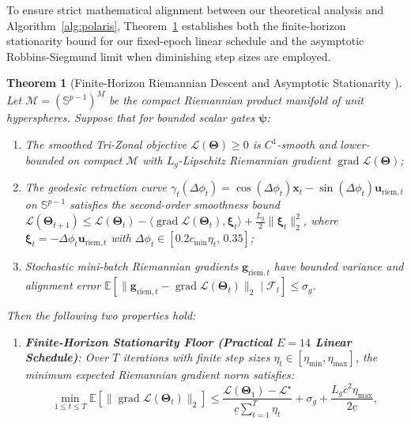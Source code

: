 \documentclass[journal]{IEEEtran}
\newtheorem{theorem}{Theorem}
\begin{document}
To ensure strict mathematical alignment between our theoretical analysis and Algorithm~\ref{alg:polaris}, Theorem~\ref{thm:convergence} establishes both the finite-horizon stationarity bound for our fixed-epoch linear schedule and the asymptotic Robbins-Siegmund limit when diminishing step sizes are employed.

\begin{theorem}[Finite-Horizon Riemannian Descent and Asymptotic Stationarity \cite{bonnabel2013stochastic,absil2008optimization}]
\label{thm:convergence}
Let $\mathcal{M} = (\mathbb{S}^{p-1})^M$ be the compact Riemannian product manifold of unit hyperspheres. Suppose that for bounded scalar gates $\boldsymbol{\psi}$:
\begin{enumerate}
    \item[(A1)] The smoothed Tri-Zonal objective $\mathcal{L}(\boldsymbol{\Theta}) \ge 0$ is $C^1$-smooth and lower-bounded on compact $\mathcal{M}$ with $L_g$-Lipschitz Riemannian gradient $\operatorname{grad}\mathcal{L}(\boldsymbol{\Theta})$;
    \item[(A2)] The geodesic retraction curve $\gamma_t(\Delta\phi_t) = \cos(\Delta\phi_t)\mathbf{x}_t - \sin(\Delta\phi_t)\mathbf{u}_{\text{riem},t}$ on $\mathbb{S}^{p-1}$ satisfies the second-order smoothness bound $\mathcal{L}(\boldsymbol{\Theta}_{t+1}) \le \mathcal{L}(\boldsymbol{\Theta}_t) - \langle \operatorname{grad}\mathcal{L}(\boldsymbol{\Theta}_t), \boldsymbol{\xi}_t \rangle + \frac{L_g}{2}\|\boldsymbol{\xi}_t\|_2^2$, where $\boldsymbol{\xi}_t = -\Delta\phi_t \mathbf{u}_{\text{riem},t}$ with $\Delta\phi_t \in [0.2 c_{\min}\eta_t, \, 0.35]$;
    \item[(A3)] Stochastic mini-batch Riemannian gradients $\mathbf{g}_{\text{riem},t}$ have bounded variance and alignment error $\mathbb{E}[\|\mathbf{g}_{\text{riem},t} - \operatorname{grad}\mathcal{L}(\boldsymbol{\Theta}_t)\|_2 \mid \mathcal{F}_t] \le \sigma_g$.
\end{enumerate}
Then the following two properties hold:
\begin{enumerate}
    \item \textbf{Finite-Horizon Stationarity Floor (Practical $E=14$ Linear Schedule)}: Over $T$ iterations with finite step sizes $\eta_t \in [\eta_{\min}, \eta_{\max}]$, the minimum expected Riemannian gradient norm satisfies:
    \begin{equation}
    \min_{1 \le t \le T} \mathbb{E}\!\left[\|\operatorname{grad}\mathcal{L}(\boldsymbol{\Theta}_t)\|_2\right] \le \frac{\mathcal{L}(\boldsymbol{\Theta}_1) - \mathcal{L}^{\star}}{\underline{c}\sum_{t=1}^T \eta_t} + \sigma_g + \frac{L_g \overline{c}^2 \eta_{\max}}{2\underline{c}},

\end{equation}
\end{enumerate}
\end{theorem}
\end{document}
